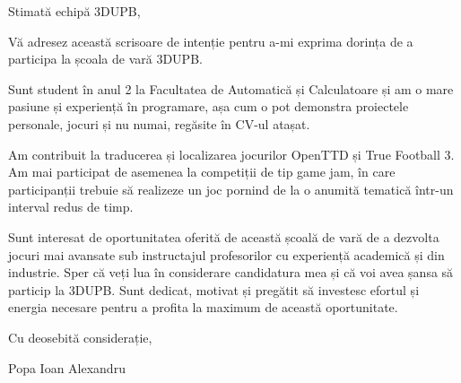 \documentclass[parskip=full]{scrartcl}
\begin{document}
\begin{center}
Stimată echipă 3DUPB,
\end{center}

Vă adresez această scrisoare de intenție pentru a-mi exprima dorința de a participa la școala de vară 3DUPB.

Sunt student în anul 2 la Facultatea de Automatică și Calculatoare și am o mare pasiune și experiență în programare, așa cum o pot demonstra proiectele personale, jocuri și nu numai, regăsite în CV-ul atașat.

Am contribuit la traducerea și localizarea jocurilor OpenTTD și True Football 3.
Am mai participat de asemenea la competiții de tip game jam, în care participanții trebuie să realizeze un joc pornind de la o anumită tematică într-un interval redus de timp.

Sunt interesat de oportunitatea oferită de această școală de vară de a dezvolta jocuri mai avansate sub instructajul profesorilor cu experiență academică și din industrie.
Sper că veți lua în considerare candidatura mea și că voi avea șansa să particip la 3DUPB.
Sunt dedicat, motivat și pregătit să investesc efortul și energia necesare pentru a profita la maximum de această oportunitate.

\begin{flushleft}
Cu deosebită considerație,

Popa Ioan Alexandru
\end{flushleft}
\end{document}
